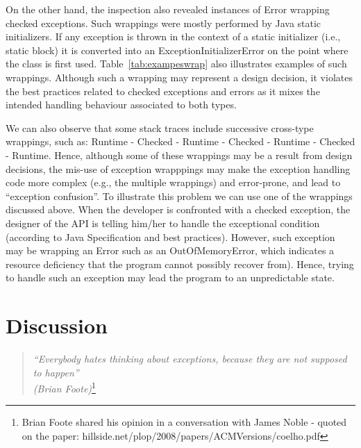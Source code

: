 On the other hand, the inspection 
also revealed instances of Error wrapping checked exceptions. Such wrappings were 
mostly performed by Java static initializers. If any exception is thrown in the context of a static initializer 
(i.e., static block)  it is converted into an ExceptionInitializerError 
on the point where the class is first used.  Table~\ref{tab:exampeswrap} also illustrates
examples of such wrappings. Although such a wrapping may represent a design decision,
it violates the best practices related to checked exceptions and errors as it mixes the intended handling 
behaviour associated to both types.

We can also observe that some stack traces include successive cross-type wrappings, 
such as: Runtime - Checked - Runtime - Checked - Runtime - Checked -
Runtime. 
Hence, although some of these wrappings may be a result from design decisions, the mis-use of exception wrapppings may make the exception handling 
code more complex (e.g., the multiple wrappings) and error-prone,
 and lead to ``exception confusion''. To illustrate this problem we can use one of the wrappings discussed above.
When the developer is confronted with a checked exception, the designer of the API is telling him/her 
to handle the exceptional condition (according to Java Specification and 
best practices). However, such exception may be wrapping an Error such
as an OutOfMemoryError, which indicates a resource deficiency 
that the program cannot possibly recover from). Hence, trying to
handle such an exception  
may lead the program to an unpredictable state.



\section{Discussion}
\label{sec:disc}

\begin{quotation}
\noindent
 \emph{``Everybody hates thinking about exceptions, because they are not supposed to happen''\\
  (Brian Foote)}\footnote{Brian Foote shared his opinion in a conversation with James Noble - quoted on the paper: hillside.net/plop/2008/papers/ACMVersions/coelho.pdf}
\end{quotation}

